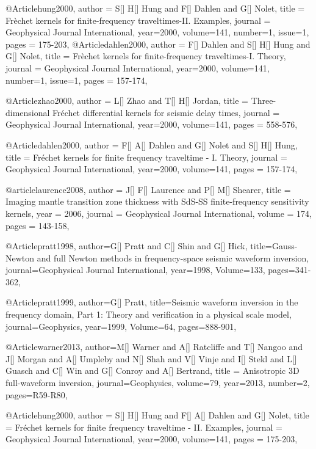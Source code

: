 @Article{hung2000,
  author =	 {S[] H[] Hung and F[] Dahlen and G[] Nolet},
  title =	 {Fr\`{e}chet kernels for finite-frequency traveltimes-II. Examples},
  journal =	 {Geophysical Journal International},
  year=2000,
  volume=141,
  number=1,
  issue=1,
  pages =	 {175-203},
}
@Article{dahlen2000,
  author =	 { F[] Dahlen and S[] H[] Hung and G[] Nolet},
  title =	 {Fr\`{e}chet kernels for finite-frequency traveltimes-I. Theory},
  journal =	 {Geophysical Journal International},
  year=2000,
  volume=141,
  number=1,
  issue=1,
  pages =	 {157-174},
}

@Article{zhao2000,
  author =	 {L[] Zhao and T[] H[] Jordan},
  title =	 {Three-dimensional Fr\'{e}chet differential kernels for seismic delay times},
  journal =	 {Geophysical Journal International},
  year=2000,
  volume=141,
  pages =	 {558-576},
}

@Article{dahlen2000,
  author =	 {F[] A[] Dahlen and G[] Nolet and S[] H[] Hung},
  title =	 {Fr\'{e}chet kernels for finite frequency traveltime - {I}. Theory},
  journal =	 {Geophysical Journal International},
  year=2000,
  volume=141,
  pages =	 {157-174},
}

@article{laurence2008,
author = {J[] F[] Laurence and P[] M[] Shearer},
title = {Imaging mantle transition zone thickness with {S}d{S-SS} finite-frequency sensitivity kernels},
year = {2006},
journal = {Geophysical Journal International},
volume = {174},
pages = {143-158},
}

@Article{pratt1998,
  author={G[] Pratt and C[] Shin and G[] Hick},
  title={Gauss-{N}ewton and full {N}ewton methods in frequency-space seismic waveform inversion},
  journal={Geophysical Journal International},
  year=1998,
  Volume=133,
  pages={341-362},
}

@Article{pratt1999,
  author={G[] Pratt},
  title={Seismic waveform inversion in the frequency domain, {P}art 1: {T}heory and verification in a physical scale model},
  journal={Geophysics},
  year=1999,
  Volume=64,
  pages={888-901},
}

@Article{warner2013,
  author={M[] Warner and A[] Ratcliffe and T[] Nangoo and J[] Morgan and A[] Umpleby and N[] Shah and V[] Vinje and I[] Stekl and L[] Guasch and C[] Win and G[] Conroy and A[] Bertrand},
  title = {Anisotropic 3{D} full-waveform inversion},
  journal={Geophysics},
  volume=79,
  year=2013,
  number=2,
  pages={R59-R80},
}

@Article{hung2000,
  author =	 {S[] H[] Hung and F[] A[] Dahlen and G[] Nolet},
  title =	 {Fr\'{e}chet kernels for finite frequency traveltime - {II}. Examples},
  journal =	 {Geophysical Journal International},
  year=2000,
  volume=141,
  pages =	 {175-203},
}


